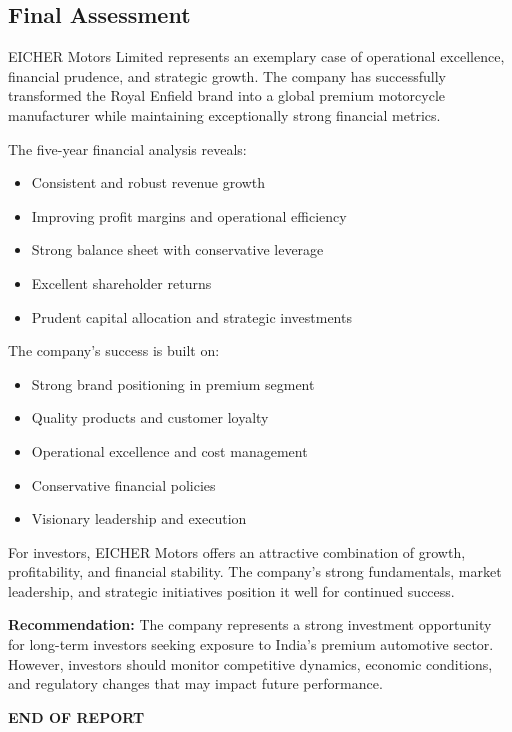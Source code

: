 \documentclass[8pt,a4paper]{article}
\begin{document}
\subsection{Final Assessment}

EICHER Motors Limited represents an exemplary case of operational excellence, financial prudence, and strategic growth. The company has successfully transformed the Royal Enfield brand into a global premium motorcycle manufacturer while maintaining exceptionally strong financial metrics.

The five-year financial analysis reveals:
\begin{itemize}
    \item Consistent and robust revenue growth
    \item Improving profit margins and operational efficiency
    \item Strong balance sheet with conservative leverage
    \item Excellent shareholder returns
    \item Prudent capital allocation and strategic investments
\end{itemize}

The company's success is built on:
\begin{itemize}
    \item Strong brand positioning in premium segment
    \item Quality products and customer loyalty
    \item Operational excellence and cost management
    \item Conservative financial policies
    \item Visionary leadership and execution
\end{itemize}

For investors, EICHER Motors offers an attractive combination of growth, profitability, and financial stability. The company's strong fundamentals, market leadership, and strategic initiatives position it well for continued success.

\textbf{Recommendation:} The company represents a strong investment opportunity for long-term investors seeking exposure to India's premium automotive sector. However, investors should monitor competitive dynamics, economic conditions, and regulatory changes that may impact future performance.

\newpage

\begin{center}
\textbf{END OF REPORT}
\end{center}
\end{document}
